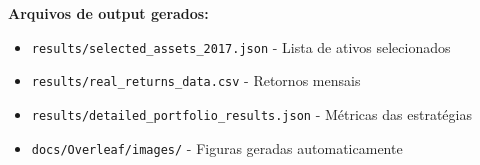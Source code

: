 \textbf{Arquivos de output gerados:}
\begin{itemize}
    \item \texttt{results/selected\_assets\_2017.json} - Lista de ativos selecionados
    \item \texttt{results/real\_returns\_data.csv} - Retornos mensais
    \item \texttt{results/detailed\_portfolio\_results.json} - Métricas das estratégias
    \item \texttt{docs/Overleaf/images/} - Figuras geradas automaticamente
\end{itemize}